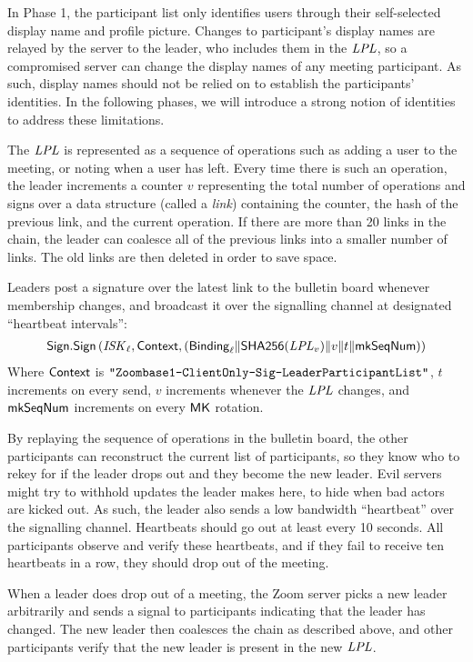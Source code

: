 In Phase 1, the participant list only identifies users through their self-selected display name and
profile picture. Changes to participant's display names are relayed by the server to the leader, who
includes them in the $\mathit{LPL}$, so a compromised server can change the display names of any meeting
participant. As such, display names should not be relied on to establish the participants'
identities. In the following phases, we will introduce a strong notion of identities to address
these limitations.

The $\mathit{LPL}$ is represented as a sequence of operations such as adding a user to the meeting, or noting when a user has left. Every time there is such an operation, the leader increments a counter $v$ representing the total number of operations and signs over a data structure (called a \textit{link}) containing the counter, the hash of the previous link, and the current operation. If there are more than 20 links in the chain, the leader can coalesce all of the previous links into a smaller number of links. The old links are then deleted in order to save space.

Leaders post a signature over the latest link to the bulletin board whenever membership changes, and broadcast it over the signalling channel at designated ``heartbeat intervals'':
%
\begin{align*}
{\sf Sign}.\mathsf{Sign} \left(\mathit{ISK}_{\ell}, {\sf Context}, ({\sf Binding}_{\ell} \| \mathsf{SHA256}(\mathit{LPL}_v) \| v \| t \| \mathsf{mkSeqNum} ) \right)
\end{align*}
%
Where ${\sf Context}$ is $\texttt{"Zoombase1-ClientOnly-Sig-Leader\-Participant\-List"}$, $t$ increments on every send, $v$ increments whenever the $\mathit{LPL}$ changes, and $\mathsf{mkSeqNum}$ increments on every ${\sf MK}$ rotation.

By replaying the sequence of operations in the bulletin board, the other participants can reconstruct the current list of participants, so they know who to rekey for if the leader drops out and they become the new leader. Evil servers might try to withhold updates the leader makes here, to hide when bad actors are kicked out. As such, the leader also sends a low bandwidth ``heartbeat'' over the signalling channel. Heartbeats should go out at least every 10 seconds. All participants observe and verify these heartbeats, and if they fail to receive ten heartbeats in a row, they should drop out of the meeting.

When a leader does drop out of a meeting, the Zoom server picks a new leader arbitrarily and sends a signal to participants indicating that the leader has changed. The new leader then coalesces the chain as described above, and other participants verify that the new leader is present in the new $\mathit{LPL}$.

